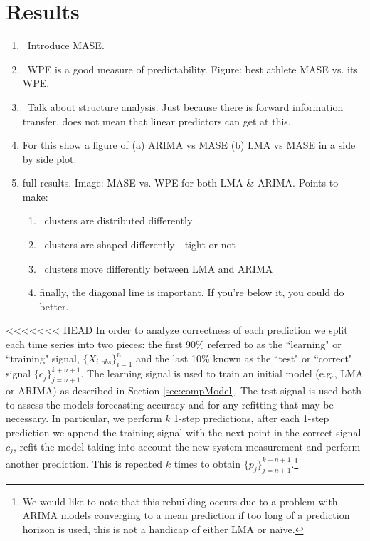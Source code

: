 \documentclass{article}
\newcommand{\cmark}{\ding{51}}
\begin{document}
 \section{Results} %
 \label{sec:results}

\begin{enumerate}
\item \cmark~Introduce MASE.
\item \cmark~WPE is a good measure of predictability.  Figure: best athlete MASE vs.
its WPE.
\item \cmark~Talk about structure analysis. Just because there is forward information
transfer, does not mean that linear predictors can get at this.
\item For this show a figure of (a) ARIMA vs MASE (b) LMA vs MASE in a side by
side plot.
\item full results.  Image: MASE vs. WPE for both LMA \& ARIMA.  Points to make:
\begin{enumerate}
\item \cmark~clusters are distributed differently
\item \cmark~clusters are shaped differently---tight or not
\item \cmark~clusters move differently between LMA and ARIMA
\item finally, the diagonal line is important. If you're below it, you could do
better.
\end{enumerate}
\end{enumerate}




<<<<<<< HEAD
In order to analyze correctness of each prediction we split each time series into two pieces: the first 90\% referred to as the ``learning" or ``training" signal, $\{X_{i,obs}\}_{i=1}^{n}$ and the last 10\% known as the ``test" or ``correct" signal $\{c_j\}_{j=n+1}^{k+n+1}$. The learning signal is used to train an initial model (e.g., LMA or ARIMA) as described in Section \ref{sec:compModel}. The test signal is used both to assess the models forecasting accuracy and for any refitting that may be necessary. In particular, we perform $k$ 1-step predictions, after each 1-step prediction we append the training signal with the next point in the correct signal $c_j$, refit the model taking into account the new system measurement and perform another prediction. This is repeated $k$ times to obtain $\{p_j\}_{j=n+1}^{k+n+1}$.\footnote{We would like to note that this rebuilding occurs due to a problem with ARIMA models converging to a mean prediction if too long of a prediction horizon is used, this is not a handicap of either LMA or na\"ive.}
\end{document}
